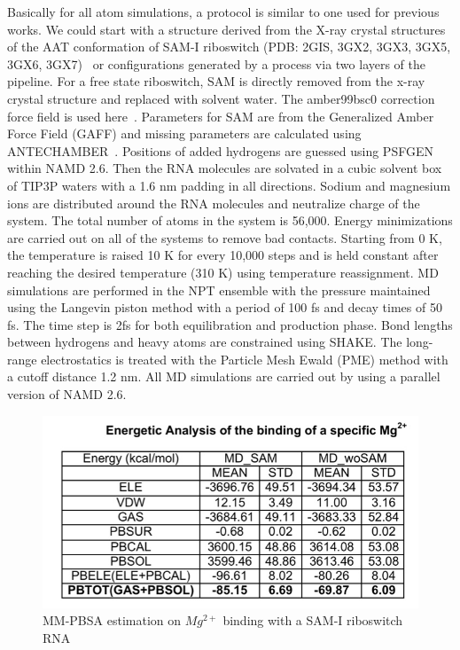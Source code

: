\documentclass[a4paper,10pt]{article}
\begin{document}
Basically for all atom simulations, a protocol is similar to one used for previous works.  We could start with a structure derived from the X-ray crystal structures of the AAT conformation of SAM-I riboswitch (PDB: 2GIS, 3GX2, 3GX3, 3GX5, 3GX6, 3GX7)~\cite{montange} or configurations generated by a process via two layers of the pipeline. For a free state riboswitch, SAM is directly removed from the x-ray crystal structure and replaced with solvent water. The amber99bsc0 correction force field is used here~\cite{alberto}. Parameters for SAM are from the Generalized Amber Force Field (GAFF) and missing parameters are calculated using ANTECHAMBER~\cite{wang}. Positions of added hydrogens are guessed using PSFGEN within NAMD 2.6. Then the RNA molecules are solvated in a cubic solvent box of TIP3P waters with a 1.6 nm padding in all directions. Sodium and magnesium ions are distributed around the RNA molecules and neutralize charge of the system. The total number of atoms in the system is 56,000. Energy minimizations are carried out on all of the systems to remove bad contacts. Starting from 0 K, the temperature is raised 10 K for every 10,000 steps and is held constant after reaching the desired temperature (310 K) using temperature reassignment. MD simulations are performed in the NPT ensemble with the pressure maintained using the Langevin piston method with a period of 100 fs and decay times of 50 fs. The time step is 2fs for both equilibration and production phase. Bond lengths between hydrogens and heavy atoms are constrained using SHAKE. The long-range electrostatics is treated with the Particle Mesh Ewald (PME) method with a cutoff distance 1.2 nm.  All MD simulations are carried out by using a parallel version of NAMD 2.6.

\begin{figure}
\begin{center}
  \includegraphics[scale=0.4]{mm-pbsa-mg}
   \caption{MM-PBSA estimation on ${Mg^{2+}}$ binding with a SAM-I riboswitch RNA}
\end{center}
\label{fig:mm-pbsa-mg-table}
\end{figure}
\end{document}
